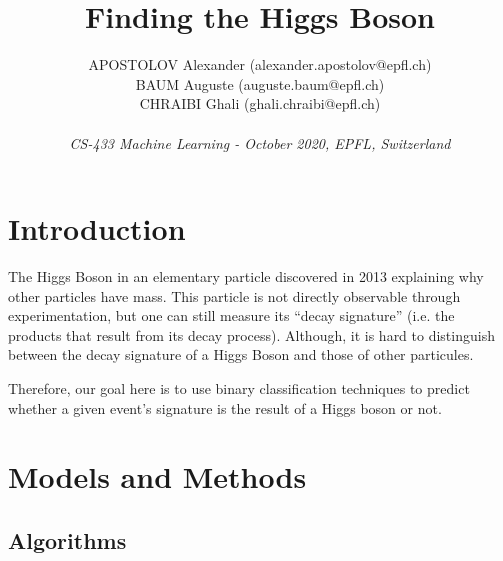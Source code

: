 \documentclass[10pt,conference,compsocconf]{IEEEtran}
\begin{document}
\title{{\LARGE Finding the Higgs Boson}\vspace{-3mm}}    

\author{
  APOSTOLOV Alexander (alexander.apostolov@epfl.ch)\\
  BAUM Auguste (auguste.baum@epfl.ch)\\
  CHRAIBI Ghali (ghali.chraibi@epfl.ch)\\
  \\
  \textit{CS-433 Machine Learning - October 2020, EPFL, Switzerland}
}
\maketitle

\begin{abstract}
\end{abstract}

\section{Introduction}

The Higgs Boson in an elementary particle discovered in 2013 explaining why other particles have mass. This particle is not directly observable through experimentation, but one can still measure its ``decay signature'' (i.e. the products that result from its decay process). Although, it is hard to distinguish between the decay signature of a Higgs Boson and those of other particules.

Therefore, our goal here is to use binary classification techniques to predict whether a given event’s signature is the result of a Higgs boson or not.


\section{Models and Methods}

\subsection{Algorithms}
\end{document}
